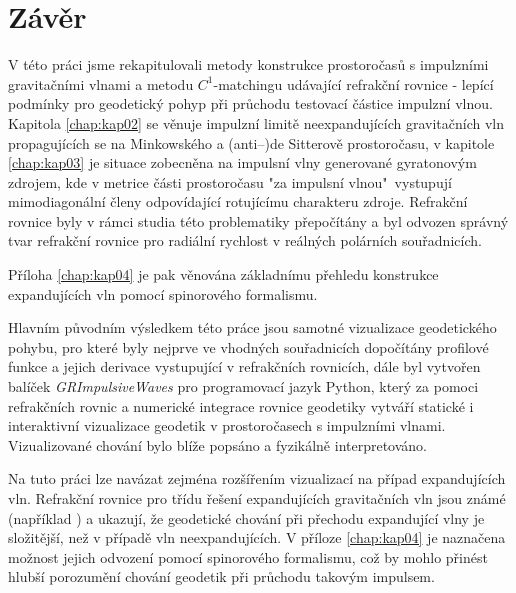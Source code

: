 \chapter*{Závěr}

V této práci jsme rekapitulovali metody konstrukce prostoročasů s impulzními gravitačními vlnami
a metodu $C^1$-matchingu udávající refrakční rovnice - lepící podmínky pro geodetický pohyp při průchodu
testovací částice impulzní vlnou. Kapitola \ref{chap:kap02} se věnuje impulzní limitě neexpandujících
gravitačních vln propagujících se na Minkowského a (anti--)de Sitterově prostoročasu, v kapitole \ref{chap:kap03}
je situace zobecněna na impulsní vlny generované gyratonovým zdrojem, kde v metrice části prostoročasu "za impulsní vlnou"\
vystupují mimodiagonální členy odpovídající rotujícímu charakteru zdroje.
Refrakční rovnice byly v rámci studia této problematiky přepočítány a byl odvozen správný tvar refrakční rovnice
pro radiální rychlost v reálných polárních souřadnicích.

Příloha \ref{chap:kap04} je pak věnována základnímu přehledu konstrukce expandujících vln pomocí spinorového formalismu.

Hlavním původním výsledkem této práce jsou samotné vizualizace geodetického pohybu, pro které byly nejprve ve vhodných souřadnicích dopočítány
profilové funkce a jejich derivace vystupující v refrakčních rovnicích, dále byl vytvořen balíček \textit{GRImpulsiveWaves} pro programovací jazyk
Python, který za pomoci refrakčních rovnic a numerické integrace rovnice geodetiky
vytváří statické i interaktivní vizualizace geodetik v prostoročasech s impulzními vlnami.
Vizualizované chování bylo blíže popsáno a fyzikálně interpretováno.

Na tuto práci lze navázat zejména rozšířením vizualizací na případ expandujících vln. Refrakční rovnice pro
třídu řešení expandujících gravitačních vln jsou známé (například \cite{Podolsky:2016mqg}) a ukazují, že
geodetické chování při přechodu expandující vlny je složitější, než v případě vln neexpandujících. V příloze \ref{chap:kap04}
je naznačena možnost jejich odvození pomocí spinorového formalismu, což by mohlo přinést hlubší porozumění chování geodetik
při průchodu takovým impulsem.

\clearpage
